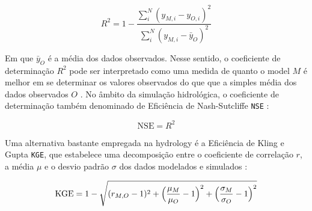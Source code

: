 \documentclass[./main.tex]{subfiles}
\begin{document}
\begin{linenomath*}
\begin{equation} 
	\label{eq:r2}
 R^2 = 1 - \frac{\sum_{i}^{N} (y_{M, i} - y_{O, i})^2}{\sum_{i}^{N} (y_{M, i} - \bar{y}_{O})^2}
\end{equation}
\end{linenomath*}
Em que $\bar{y}_{O}$ é a média dos dados observados. Nesse sentido, o coeficiente de determinação $R^2$ pode ser interpretado como uma medida de quanto o \gls{model} $M$ é melhor em se determinar os valores observados do que que a simples média dos dados observados $O$ . No âmbito da simulação hidrológica, o coeficiente de determinação também denominado de Eficiência de Nash-Sutcliffe \texttt{NSE} \cite{Nash1970}:
\begin{linenomath*}
\begin{equation} 
	\label{eq:nse}
 \text{NSE} = R^2
\end{equation}
\end{linenomath*}
Uma alternativa bastante empregada na \gls{hydrology} é a Eficiência de Kling e Gupta \texttt{KGE}, que estabelece uma decomposição entre o coeficiente de correlação $r$, a média $\mu$ e o desvio padrão $\sigma$ dos dados modelados e simulados \cite{Gupta2009}:
\begin{linenomath*}
\begin{equation} 
	\label{eq:kge}
 \text{KGE} = 1 - \sqrt{(r_{M,O} - 1)^2 + \Big{(}\frac{\mu_M}{\mu_O} - 1\Big{)}^2 + \Big{(}\frac{\sigma_M}{\sigma_O} - 1\Big{) }^2 } 
\end{equation}
\end{linenomath*}
\end{document}
